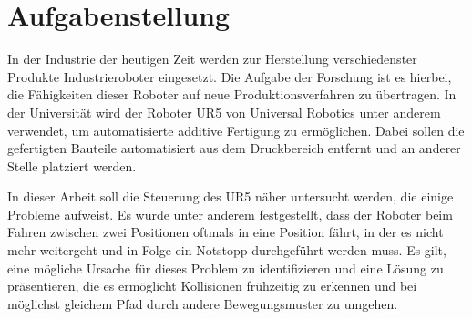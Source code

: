 \chapter*{Aufgabenstellung}

In der Industrie der heutigen Zeit werden zur Herstellung verschiedenster Produkte Industrieroboter eingesetzt.
Die Aufgabe der Forschung ist es hierbei, die Fähigkeiten dieser Roboter auf neue Produktionsverfahren zu übertragen.
In der Universität wird der Roboter UR5 von Universal Robotics unter anderem verwendet, um automatisierte additive Fertigung zu ermöglichen.
Dabei sollen die gefertigten Bauteile automatisiert aus dem Druckbereich entfernt und an anderer Stelle platziert werden.

In dieser Arbeit soll die Steuerung des UR5 näher untersucht werden, die einige Probleme aufweist.
Es wurde unter anderem festgestellt, dass der Roboter beim Fahren zwischen zwei Positionen oftmals in eine Position fährt, in der es nicht mehr weitergeht und in Folge ein Notstopp durchgeführt werden muss.
Es gilt, eine mögliche Ursache für dieses Problem zu identifizieren und eine Lösung zu präsentieren, die es ermöglicht Kollisionen frühzeitig zu erkennen und bei möglichst gleichem Pfad durch andere Bewegungsmuster zu umgehen.